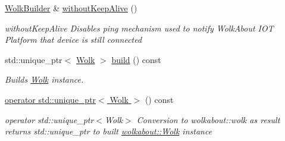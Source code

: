 \begin{DoxyCompactItemize}
\hyperlink{classwolkabout_1_1_wolk_builder}{Wolk\+Builder} \& \hyperlink{classwolkabout_1_1_wolk_builder_a22893971f31f5dccb5dec0690324a038}{without\+Keep\+Alive} ()
\begin{DoxyCompactList}\small\item\em without\+Keep\+Alive Disables ping mechanism used to notify Wolk\+About I\+OT Platform that device is still connected \end{DoxyCompactList}\item 
std\+::unique\+\_\+ptr$<$ \hyperlink{classwolkabout_1_1_wolk}{Wolk} $>$ \hyperlink{classwolkabout_1_1_wolk_builder_aad4c9b0c925a023cf670dc2fdc6631f3}{build} () const 
\begin{DoxyCompactList}\small\item\em Builds \hyperlink{classwolkabout_1_1_wolk}{Wolk} instance. \end{DoxyCompactList}\item 
\hyperlink{classwolkabout_1_1_wolk_builder_a878d41186bd310862e90eecde01a6a1b}{operator std\+::unique\+\_\+ptr$<$ Wolk $>$} () const 
\begin{DoxyCompactList}\small\item\em operator std\+::unique\+\_\+ptr$<$\+Wolk$>$ Conversion to wolkabout\+::wolk as result returns std\+::unique\+\_\+ptr to built \hyperlink{classwolkabout_1_1_wolk}{wolkabout\+::\+Wolk} instance \end{DoxyCompactList}\end{DoxyCompactItemize}
